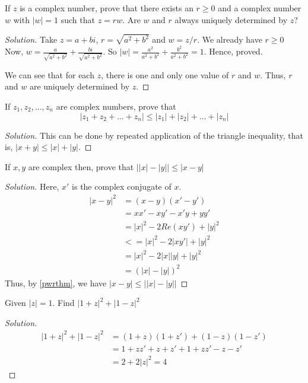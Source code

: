 \begin{prblm}
	If $z$ is a complex number, prove that there exists an $r \geq 0$ and a complex number $w$ with $|w| = 1$
	such that $z = rw$. Are $w$ and $r$ always uniquely determined by $z$?
	\begin{proof}[Solution]
		Take $z = a + bi$, $r = \sqrt{a^2 + b^2}$ and $w = z / r$. We already have $r \geq 0$
		Now, $w = \frac{a}{\sqrt{a^2+b^2}} + \frac{bi}{\sqrt{a^2+b^2}}$.
		So $|w| = \frac{a^2}{a^2+b^2} + \frac{b^2}{a^2+b^2} = 1$. Hence, proved.

		We can see that for each $z$, there is one and only one value of $r$ and $w$.
		Thus, $r$ and $w$ are uniquely determined by $z$.

	\end{proof}
\end{prblm}


\begin{prblm}
	If $z_1, z_2, \dots, z_n$ are complex numbers, prove that
	$$ | z_1 + z_2 + \dots + z_n | \leq |z_1| + |z_2| + \dots + |z_n| $$
	\begin{proof}[Solution]
		This can be done by repeated application of the triangle inequality, that is,
		$|x + y| \leq |x| + |y|$.
	\end{proof}
\end{prblm}

\begin{prblm}
	If $x, y$ are complex then, prove that $\big| |x| - |y| \big| \leq |x - y|$
	\begin{proof}[Solution]
		Here, $x'$ is the complex conjugate of $x$.
		\begin{align*}
		|x-y|^2
			& = (x-y)(x'-y') \\
			& = xx' - xy' - x'y + yy' \\
			& = |x|^2 - 2Re(xy') + |y|^2 \\
			& <= |x|^2 -2|xy'| + |y|^2 \\
			& = |x|^2 - 2|x||y| + |y|^2 \\
			& = (|x| - |y|)^2
		\end{align*}
		Thus, by \ref{pwrthm}, we have $|x-y| \leq \big| |x|-|y| \big|$
	\end{proof}
\end{prblm}


\begin{prblm}
	Given $|z| = 1$. Find $|1+z|^2 + |1-z|^2$
	\begin{proof}[Solution]
		\begin{align*}
		|1+z|^2 + |1-z|^2
			& = (1+z)(1+z') + (1-z)(1-z') \\
			& = 1 + zz' + z + z' + 1 + zz' - z - z' \\
			& = 2 + 2|z|^2 = 4
		\end{align*}
	\end{proof}
\end{prblm}


